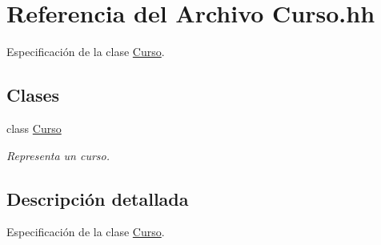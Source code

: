 \hypertarget{_curso_8hh}{}\section{Referencia del Archivo Curso.\+hh}
\label{_curso_8hh}


Especificación de la clase \mbox{\hyperlink{class_curso}{Curso}}.  


\subsection*{Clases}
\begin{DoxyCompactItemize}
\item 
class \mbox{\hyperlink{class_curso}{Curso}}
\begin{DoxyCompactList}\small\item\em Representa un curso. \end{DoxyCompactList}\end{DoxyCompactItemize}


\subsection{Descripción detallada}
Especificación de la clase \mbox{\hyperlink{class_curso}{Curso}}. 

